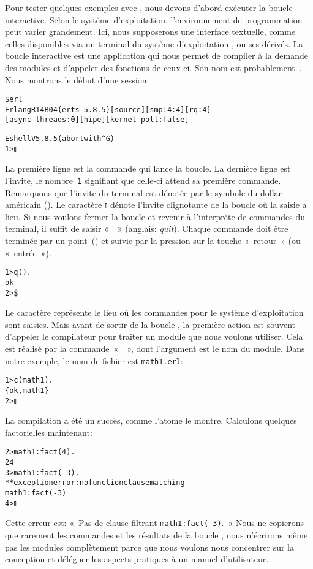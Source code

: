 Pour tester quelques exemples avec , nous devons
d'abord exécuter la boucle interactive. Selon le système
d'exploitation, l'environnement de programmation peut varier
grandement. Ici, nous supposerons une interface textuelle, comme
celles disponibles via un terminal du système d'exploitation \Unix, ou
ses dérivés. La boucle interactive \Erlang est une application qui
nous permet de compiler à la demande des modules et d'appeler des
fonctions de ceux-ci. Son nom est probablement~. Nous
montrons le début d'une session:
\begin{alltt}
\$ erl
Erlang R14B04 (erts-5.8.5) [source] [smp:4:4] [rq:4]
[async-threads:0] [hipe] [kernel-poll:false]

Eshell V5.8.5  (abort with ^G)
1> \(\talloblong\)
\end{alltt}
La première ligne est la commande qui lance la boucle. La dernière
ligne est l'invite, le nombre~\texttt{1} signifiant que celle-ci
attend sa première commande. Remarquons que l'invite du terminal est
dénotée par le symbole du dollar américain (\erlcode{\$}). Le
caractère \(\talloblong\) dénote l'invite clignotante de la boucle
\Erlang où la saisie a lieu. Si nous voulons fermer la boucle et
revenir à l'interprète de commandes du terminal, il suffit de saisir
«~~» (anglais: \emph{quit}). Chaque commande doit être
terminée par un point~() et suivie par la pression sur la
touche «~retour~» (ou «~entrée~»).
\begin{alltt}
1> q().
ok
2> \$ \textvisiblespace
\end{alltt}
Le caractère \erlcode{\textvisiblespace} représente le lieu où les
commandes pour le système d'exploitation sont saisies. Mais avant de
sortir de la boucle \Erlang, la première action est souvent d'appeler
le compilateur \Erlang pour traiter un module que nous voulons
utiliser. Cela est réalisé par la commande~«~~», dont
l'argument est le nom du module. Dans notre exemple, le nom de fichier
est \texttt{math1.erl}:
\begin{alltt}
1> c(math1).
\{ok,math1\}
2> \(\talloblong\)
\end{alltt}
La compilation a été un succès, comme l'atome  le
montre. Calculons quelques factorielles maintenant:
\begin{alltt}
2> math1:fact(4).
24
3> math1:fact(-3).
** exception error: no function clause matching
math1:fact(-3)
4> \(\talloblong\)
\end{alltt}
Cette erreur est: «~Pas de clause filtrant \texttt{math1:fact(-3)}.~»
Nous ne copierons que rarement les commandes et les résultats de la
boucle \Erlang, nous n'écrirons même pas les modules complètement
parce que nous voulons nous concentrer sur la conception et déléguer
les aspects pratiques à un manuel d'utilisateur.

